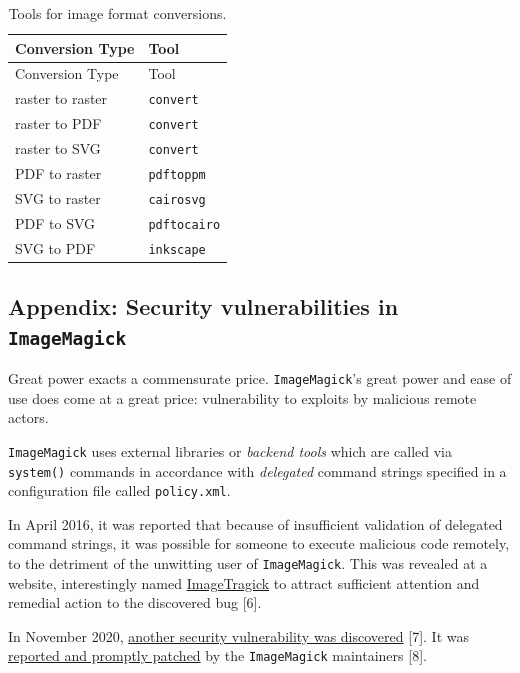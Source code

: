 \documentclass[
  11pt,
  british,
  a4paper,
]{article}
\begin{document}
\begin{longtable}[]{@{}ll@{}}
\caption{Tools for image format conversions.
\label{tbl:formats}}\tabularnewline
\toprule
Conversion Type & Tool \\
\midrule
\endfirsthead
\toprule
Conversion Type & Tool \\
\midrule
\endhead
raster to raster & \texttt{convert} \\
raster to PDF & \texttt{convert} \\
raster to SVG & \texttt{convert} \\
PDF to raster & \texttt{pdftoppm} \\
SVG to raster & \texttt{cairosvg} \\
PDF to SVG & \texttt{pdftocairo} \\
SVG to PDF & \texttt{inkscape} \\
\bottomrule
\end{longtable}

\hypertarget{appendix-security-vulnerabilities-in-imagemagick}{%
\subsection{\texorpdfstring{Appendix: Security vulnerabilities in
\texttt{ImageMagick}}{Appendix: Security vulnerabilities in ImageMagick}}\label{appendix-security-vulnerabilities-in-imagemagick}}

Great power exacts a commensurate price. \texttt{ImageMagick}'s great
power and ease of use does come at a great price: vulnerability to
exploits by malicious remote actors.

\texttt{ImageMagick} uses external libraries or \emph{backend tools}
which are called via \texttt{system()} commands in accordance with
\emph{delegated} command strings specified in a configuration file
called \texttt{policy.xml}.

In April 2016, it was reported that because of insufficient validation
of delegated command strings, it was possible for someone to execute
malicious code remotely, to the detriment of the unwitting user of
\texttt{ImageMagick}. This was revealed at a website, interestingly
named \href{https://imagetragick.com/}{ImageTragick} to attract
sufficient attention and remedial action to the discovered bug {[}6{]}.

In November 2020,
\href{https://portswigger.net/daily-swig/imagemagick-pdf-parsing-flaw-allowed-attacker-to-execute-shell-commands-via-maliciously-crafted-image}{another
security vulnerability was discovered} {[}7{]}. It was
\href{https://insert-script.blogspot.com/2020/11/imagemagick-shell-injection-via-pdf.html}{reported
and promptly patched} by the \texttt{ImageMagick} maintainers {[}8{]}.
\end{document}

